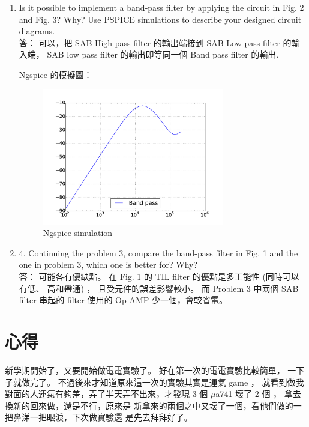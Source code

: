 \documentclass[12pt, a4paper]{article}
\begin{document}
\begin{enumerate}[itemsep=20pt, topsep=10pt]
  \item {Is it possible to implement a band-pass filter by applying the circuit in Fig. 2 and Fig. 3? Why? Use PSPICE simulations to describe your designed circuit diagrams.} \\[10pt]
    答：
    可以，把 SAB High pass filter 的輸出端接到 SAB Low pass filter 的輸入端，
    SAB low pass filter 的輸出即等同一個 Band pass filter 的輸出.

    Ngspice 的模擬圖：
    \begin{figure}[H]
      \begin{center}
        \includegraphics[width=0.75\textwidth]{fig3.pdf}
      \end{center}
      \caption{Ngspice simulation}
      \label{fig:}
    \end{figure}

  \item {4. Continuing the problem 3, compare the band-pass filter in Fig. 1
    and the one in problem 3, which one is better for? Why? } \\[10pt]
    答：
    可能各有優缺點。 在 Fig. 1 的 TIL filter 的優點是多工能性 (同時可以有低、
    高和帶通) ， 且受元件的誤差影響較小。 而 Problem 3 中兩個 SAB filter
    串起的 filter 使用的 Op AMP 少一個，會較省電。


\end{enumerate}

\section{心得}
新學期開始了，又要開始做電電實驗了。 好在第一次的電電實驗比較簡單，
一下子就做完了。 不過後來才知道原來這一次的實驗其實是運氣 game ，
就看到做我對面的人運氣有夠差，弄了半天弄不出來，才發現
3 個 $\mu$a741 壞了 2 個 ， 拿去換新的回來做，還是不行，原來是
新拿來的兩個之中又壞了一個，看他們做的一把鼻涕一把眼淚，下次做實驗還
是先去拜拜好了。
\end{document}
